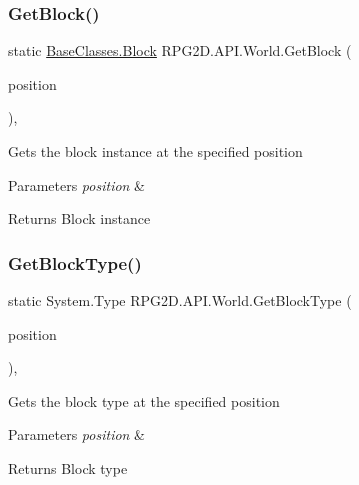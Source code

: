 \subsubsection{\texorpdfstring{Get\+Block()}{GetBlock()}}
{\footnotesize\ttfamily static \mbox{\hyperlink{class_r_p_g2_d_1_1_base_classes_1_1_block}{Base\+Classes.\+Block}} R\+P\+G2\+D.\+A\+P\+I.\+World.\+Get\+Block (\begin{DoxyParamCaption}\item[{Vector2\+Int}]{position }\end{DoxyParamCaption})\hspace{0.3cm}{\ttfamily [inline]}, {\ttfamily [static]}}



Gets the block instance at the specified position 


\begin{DoxyParams}{Parameters}
{\em position} & \\
\hline
\end{DoxyParams}
\begin{DoxyReturn}{Returns}
Block instance
\end{DoxyReturn}
\mbox{\label{class_r_p_g2_d_1_1_a_p_i_1_1_world_a2e698d1e8265a1040e7713d40aeefb69}} 
\subsubsection{\texorpdfstring{Get\+Block\+Type()}{GetBlockType()}}
{\footnotesize\ttfamily static System.\+Type R\+P\+G2\+D.\+A\+P\+I.\+World.\+Get\+Block\+Type (\begin{DoxyParamCaption}\item[{Vector2\+Int}]{position }\end{DoxyParamCaption})\hspace{0.3cm}{\ttfamily [inline]}, {\ttfamily [static]}}



Gets the block type at the specified position 


\begin{DoxyParams}{Parameters}
{\em position} & \\
\hline
\end{DoxyParams}
\begin{DoxyReturn}{Returns}
Block type
\end{DoxyReturn}
\mbox{\label{class_r_p_g2_d_1_1_a_p_i_1_1_world_ae8afbfcfaaecd14e30cf343404c4336d}} 
